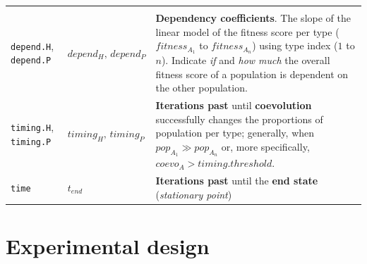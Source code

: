 \documentclass[
]{book}
\begin{document}
\begin{longtable}[]{@{}lll@{}}
\begin{minipage}[t]{0.34\columnwidth}
\end{minipage}\tabularnewline
\begin{minipage}[t]{0.36\columnwidth}\raggedright
\texttt{depend.H}, \texttt{depend.P}\strut
\end{minipage} & \begin{minipage}[t]{0.21\columnwidth}\raggedright
\(depend_{H},\,depend_{P}\)\strut
\end{minipage} & \begin{minipage}[t]{0.34\columnwidth}\raggedright
\textbf{Dependency coefficients}. The slope of the linear model of the fitness score per type (\(fitness_{A_1}\) to \(fitness_{A_n}\)) using type index (\(1\) to \(n\)). Indicate \emph{if} and \emph{how much} the overall fitness score of a population is dependent on the other population.\strut
\end{minipage}\tabularnewline
\begin{minipage}[t]{0.36\columnwidth}\raggedright
\texttt{timing.H}, \texttt{timing.P}\strut
\end{minipage} & \begin{minipage}[t]{0.21\columnwidth}\raggedright
\(timing_{H},\,timing_{P}\)\strut
\end{minipage} & \begin{minipage}[t]{0.34\columnwidth}\raggedright
\textbf{Iterations past} until \textbf{coevolution} successfully changes the proportions of population per type; generally, when \(pop_{A_1}\gg pop_{A_n}\) or, more specifically, \(coevo_A>timing.threshold\).\strut
\end{minipage}\tabularnewline
\begin{minipage}[t]{0.36\columnwidth}\raggedright
\texttt{time}\strut
\end{minipage} & \begin{minipage}[t]{0.21\columnwidth}\raggedright
\(t_{end}\)\strut
\end{minipage} & \begin{minipage}[t]{0.34\columnwidth}\raggedright
\textbf{Iterations past} until the \textbf{end state} (\emph{stationary point})\strut
\end{minipage}\tabularnewline
\bottomrule
\end{longtable}

\newpage

\hypertarget{experimental-design}{%
\section*{Experimental design}\label{experimental-design}}
\end{document}
